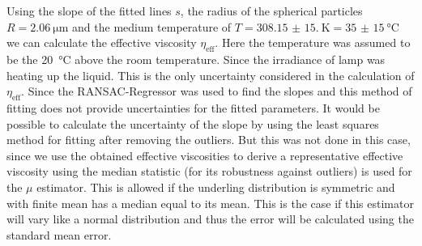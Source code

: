\documentclass[12pt,english]{scrartcl}
\begin{document}
Using the slope of the fitted lines $s$, the radius of the spherical particles
$R=\SI{2.06}{\micro\meter}$ and the medium temperature of
$T=\SI{308.15(15.00)}{\kelvin} = \SI{35(15)}{\celsius}$ we can calculate the
effective viscosity $\eta_\text{eff}$. Here the temperature was assumed to be
the \SI{20}{\celsius} above the room temperature. Since the irradiance of lamp
was heating up the liquid. This is the only uncertainty considered in the
calculation of $\eta_\text{eff}$. Since the RANSAC-Regressor was used to find
the slopes and this method of fitting does not provide uncertainties for the
fitted parameters. It would be possible to calculate the uncertainty of the
slope by using the least squares method for fitting after removing the
outliers. But this was not done in this case, since we use the obtained
effective viscosities to derive a representative effective viscosity using the
median statistic (for its robustness against outliers) is used for the $\mu$
estimator. This is allowed if the underling distribution is symmetric and with
finite mean has a median equal to its mean. This is the case if this estimator
will vary like a normal distribution and thus the error will be calculated
using the standard mean error.
\end{document}
